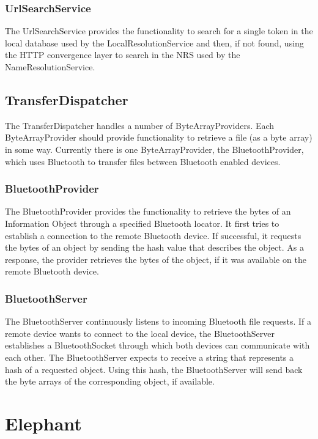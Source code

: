 \subsubsection{UrlSearchService}

The UrlSearchService provides the functionality to search for a single token in the local database 
used by the LocalResolutionService and then, if not found, using the HTTP convergence layer to search 
in the NRS used by the NameResolutionService.

\subsection{TransferDispatcher}
\label{sec:TransferDispatcher}

The TransferDispatcher handles a number of ByteArrayProviders. Each ByteArrayProvider should provide functionality to retrieve a file (as a byte array) in some way. Currently there is one ByteArrayProvider, the BluetoothProvider, which uses Bluetooth to transfer files between Bluetooth enabled devices.

\subsubsection{BluetoothProvider}
\label{sec:BluetoothProvider}
The BluetoothProvider provides the functionality to retrieve the bytes of an Information Object
through a specified Bluetooth locator. It first tries to establish a connection to the remote
Bluetooth device. If successful, it requests the bytes of an object by sending the hash value
that describes the object. As a response, the provider retrieves the bytes of the object, if
it was available on the remote Bluetooth device.

\subsubsection{BluetoothServer}
The BluetoothServer continuously listens to incoming Bluetooth file requests. 
If a remote device wants to connect to the local device, the BluetoothServer establishes
a BluetoothSocket through which both devices can communicate with each other.
The BluetoothServer expects to receive a string that represents a hash
of a requested object. Using this hash, the BluetoothServer will send back
the byte arrays of the corresponding object, if available. 

\section{Elephant}
\label{sec:Elephant}

